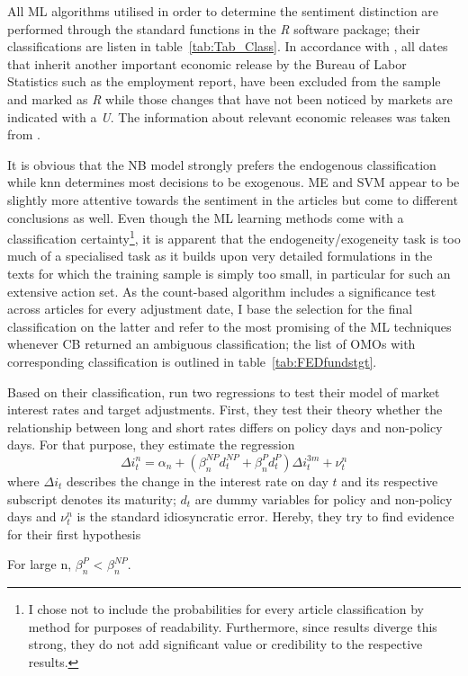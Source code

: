 All ML algorithms utilised in order to determine the sentiment distinction are performed through the standard functions in the \textit{R} software package; their classifications are listen in table~\vref{tab:Tab_Class}. 
In accordance with \textcite{Ellingsen.2003}, all dates that inherit another important economic release by the Bureau of Labor Statistics such as the employment report, have been excluded from the sample and marked as \textit{R} while those changes that have not been noticed by markets are indicated with a \textit{U}. The information about relevant economic releases was taken from \textcite{BoLS.2017}.
%

%
It is obvious that the NB model strongly prefers the endogenous classification while knn determines most decisions to be exogenous. ME and SVM appear to be slightly more attentive towards the sentiment in the articles but come to different conclusions as well. Even though the ML learning methods come with a classification certainty\footnote{I chose not to include the probabilities for every article classification by method for purposes of readability. Furthermore, since results diverge this strong, they do not add significant value or credibility to the respective results.}, it is apparent that the endogeneity/exogeneity task is too much of a specialised task as it builds upon very detailed formulations in the texts for which the training sample is simply too small, in particular for such an extensive action set. As the count-based algorithm includes a significance test across articles for every adjustment date, I base the selection for the final classification on the latter  and refer to the most promising of the ML techniques whenever CB returned an ambiguous classification; the list of OMOs with corresponding classification is outlined in table~\vref{tab:FEDfundstgt}. 

Based on their classification, \textcite{Ellingsen.2003} run two regressions to test their model of market interest rates and target adjustments. First, they test their theory whether the relationship between long and short rates differs on policy days and non-policy days. For that purpose, they estimate the regression
%
\begin{equation}
	\label{eq:PvsNP}
	\Delta i_t^n = \alpha_n + (\beta_n^{NP}d_t^{NP}+\beta_n^{P}d_t^{P})\Delta i_t^{3m}+\nu_t^n
\end{equation}
%
where $\Delta i_t$ describes the change in the interest rate on day $t$ and its respective subscript denotes its maturity; $d_t$ are dummy variables for policy and non-policy days and $\nu_t^n$ is the standard idiosyncratic error. Hereby, they try to find evidence for their first hypothesis 
%
\begin{hypothesis}
	\label{H:1}
	For large n, $\beta_n^P$ < $\beta_n^{NP}$.
\end{hypothesis}
%

